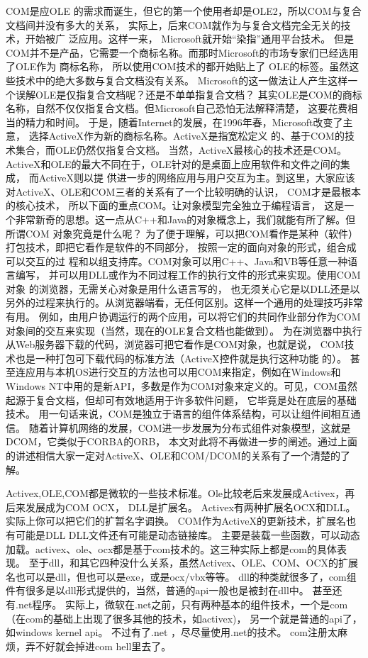 \documentclass{book}
\begin{document}
COM是应OLE 的需求而诞生，但它的第一个使用者却是OLE2，所以COM与复合文档间并没有多大的关系，
实际上，后来COM就作为与复合文档完全无关的技术，开始被广 泛应用。这样一来， Microsoft就开始“染指”通用平台技术。
但是COM并不是产品，它需要一个商标名称。而那时Microsoft的市场专家们已经选用了OLE作为 商标名称，
所以使用COM技术的都开始贴上了 OLE的标签。虽然这些技术中的绝大多数与复合文档没有关系。
Microsoft的这一做法让人产生这样一个误解OLE是仅指复合文档呢？还是不单单指复合文档？
其实OLE是COM的商标名称，自然不仅仅指复合文档。但Microsoft自己恐怕无法解释清楚，
这要花费相当的精力和时间。 于是，随着Internet的发展，在1996年春，Microsoft改变了主意，
选择ActiveX作为新的商标名称。ActiveX是指宽松定义 的、基于COM的技术集合，而OLE仍然仅指复合文档。
当然，ActiveX最核心的技术还是COM。ActiveX和OLE的最大不同在于，OLE针对的是桌面上应用软件和文件之间的集成，
而ActiveX则以提 供进一步的网络应用与用户交互为主。到这里，大家应该对ActiveX、OLE和COM三者的关系有了一个比较明确的认识，
COM才是最根本的核心技术， 所以下面的重点COM。让对象模型完全独立于编程语言，
这是一个非常新奇的思想。这一点从C++和Java的对象概念上，我们就能有所了解。但所谓COM 对象究竟是什么呢？
为了便于理解，可以把COM看作是某种（软件）打包技术，即把它看作是软件的不同部分，
按照一定的面向对象的形式，组合成可以交互的过 程和以组支持库。COM对象可以用C++、Java和VB等任意一种语言编写，
并可以用DLL或作为不同过程工作的执行文件的形式来实现。使用COM对象 的浏览器，无需关心对象是用什么语言写的，
也无须关心它是以DLL还是以另外的过程来执行的。从浏览器端看，无任何区别。这样一个通用的处理技巧非常有用。
例如，由用户协调运行的两个应用，可以将它们的共同作业部分作为COM对象间的交互来实现（当然，现在的OLE复合文档也能做到）。
为在浏览器中执行 从Web服务器下载的代码，浏览器可把它看作是COM对象，也就是说，
COM技术也是一种打包可下载代码的标准方法（ActiveX控件就是执行这种功能 的）。
甚至连应用与本机OS进行交互的方法也可以用COM来指定，例如在Windows和Windows NT中用的是新API，多数是作为COM对象来定义的。可见，COM虽然起源于复合文档，但却可有效地适用于许多软件问题，
它毕竟是处在底层的基础技术。 用一句话来说，COM是独立于语言的组件体系结构，可以让组件间相互通信。
随着计算机网络的发展，COM进一步发展为分布式组件对象模型，这就是 DCOM，它类似于CORBA的ORB，
本文对此将不再做进一步的阐述。通过上面的讲述相信大家一定对ActiveX、OLE和COM/DCOM的关系有了一个清楚的了解。

Activex,OLE,COM都是微软的一些技术标准。Ole比较老后来发展成Activex，再后来发展成为COM OCX，
DLL是扩展名。 Activex有两种扩展名OCX和DLL。实际上你可以把它们的扩暂名字调换。 COM作为ActiveX的更新技术，扩展名也有可能是DLL DLL文件还有可能是动态链接库。
主要是装载一些函数，可以动态加载。activex、ole、ocx都是基于com技术的。这三种实际上都是com的具体表现。
至于dll，和其它四种没什么关系，虽然Activex、OLE、COM、OCX的扩展名也可以是dll，但也可以是exe，或是ocx/vbx等等。
dll的种类就很多了，com组件有很多是以dll形式提供的，当然，普通的api一般也是被封在dll中。 甚至还有.net程序。 
实际上，微软在.net之前，只有两种基本的组件技术，一个是com（在com的基础上出现了很多其他的技术，如activex)，
另一个就是普通的api了，如windows kernel api。 不过有了.net ，尽尽量使用.net的技术。
com注册太麻烦，弄不好就会掉进com hell里去了。
\end{document}

